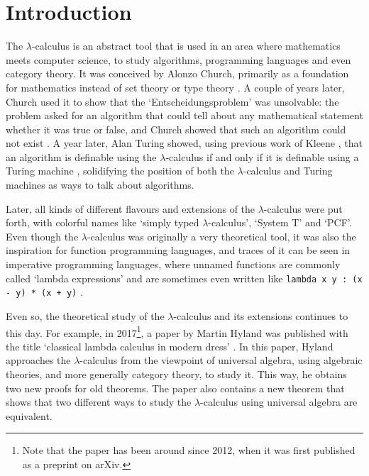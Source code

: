 \chapter{Introduction}

The $ \lambda $-calculus is an abstract tool that is used in an area where mathematics meets computer science, to study algorithms, programming languages and even category theory. It was conceived by Alonzo Church, primarily as a foundation for mathematics instead of set theory or type theory \autocite{church-lambda-calculus}. A couple of years later, Church used it to show that the `Entscheidungsproblem' was unsolvable: the problem asked for an algorithm that could tell about any mathematical statement whether it was true or false, and Church showed that such an algorithm could not exist \autocite{church-number-theory}. A year later, Alan Turing showed, using previous work of Kleene \autocite{kleene-lambda}, that an algorithm is definable using the $ \lambda $-calculus if and only if it is definable using a Turing machine \autocite{turing-lambda}, solidifying the position of both the $ \lambda $-calculus and Turing machines as ways to talk about algorithms.

Later, all kinds of different flavours and extensions of the $ \lambda $-calculus were put forth, with colorful names like `simply typed $ \lambda $-calculus', `System T' and `PCF'. Even though the $ \lambda $-calculus was originally a very theoretical tool, it was also the inspiration for function programming languages, and traces of it can be seen in imperative programming languages, where unnamed functions are commonly called `lambda expressions' \autocite{java-lambdas} and are sometimes even written like \texttt{lambda x y : (x - y) * (x + y)} \autocite{python-expressions}.

Even so, the theoretical study of the $ \lambda $-calculus and its extensions continues to this day. For example, in 2017\footnote{Note that the paper has been around since 2012, when it was first published as a preprint on arXiv.}, a paper by Martin Hyland was published with the title `classical lambda calculus in modern dress' \autocite{Hyland}. In this paper, Hyland approaches the $ \lambda $-calculus from the viewpoint of universal algebra, using algebraic theories, and more generally category theory, to study it. This way, he obtains two new proofs for old theorems. The paper also contains a new theorem that shows that two different ways to study the $ \lambda $-calculus using universal algebra are equivalent.

